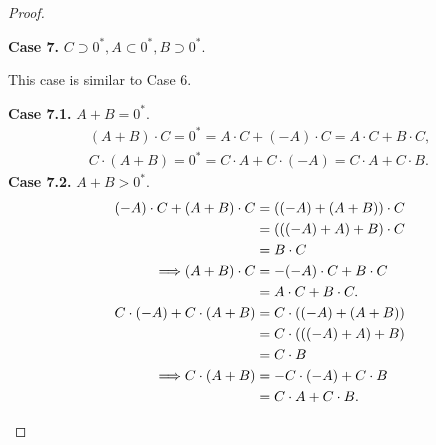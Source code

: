\begin{proof}
\begin{enumerate}[label={(F\arabic*)}, start=5]
              \textbf{Case 7.} $C\supset {0}^{*}, A\subset {0}^{*}, B\supset {0}^{*}$.

              This case is similar to Case 6.

              \textbf{Case 7.1.} $A + B = {0}^{*}$.
              \[
                  \begin{split}
                      (A + B)\cdot C = {0}^{*} = A\cdot C + (-A)\cdot C = A\cdot C + B\cdot C, \\
                      C\cdot (A + B) = {0}^{*} = C\cdot A + C\cdot (-A) = C\cdot A + C\cdot B.
                  \end{split}
              \]
              \textbf{Case 7.2.} $A + B > {0}^{*}$.
              \begin{align*}
                  (-A)\cdot C + (A + B)\cdot C   & = ((-A) + (A + B))\cdot C \\
                                                 & = (((-A) + A) + B)\cdot C \\
                                                 & = B\cdot C                \\
                  \Longrightarrow (A + B)\cdot C & = -(-A)\cdot C + B\cdot C \\
                                                 & = A\cdot C + B\cdot C.    \\
                  \bigskip
                  C\cdot (-A) + C\cdot (A + B)   & = C\cdot ((-A) + (A + B)) \\
                                                 & = C\cdot (((-A) + A) + B) \\
                                                 & = C\cdot B                \\
                  \Longrightarrow C\cdot (A + B) & = -C\cdot (-A) + C\cdot B \\
                                                 & = C\cdot A + C\cdot B.
              \end{align*}


\end{enumerate}
\end{proof}
